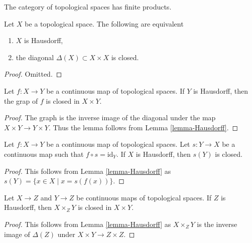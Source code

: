 \noindent
The category of topological spaces has finite products.

\begin{lemma}
\label{lemma-Hausdorff}
Let $X$ be a topological space. The following are equivalent
\begin{enumerate}
\item $X$ is Hausdorff,
\item the diagonal $\Delta(X) \subset X \times X$ is closed.
\end{enumerate}
\end{lemma}

\begin{proof}
Omitted.
\end{proof}

\begin{lemma}
\label{lemma-graph-closed}
Let $f : X \to Y$ be a continuous map of topological spaces.
If $Y$ is Hausdorff, then the grap of $f$ is closed in $X \times Y$.
\end{lemma}

\begin{proof}
The graph is the inverse image of the diagonal under the map
$X \times Y \to Y \times Y$. Thus the lemma follows from
Lemma \ref{lemma-Hausdorff}.
\end{proof}

\begin{lemma}
\label{lemma-section-closed}
Let $f : X \to Y$ be a continuous map of topological spaces.
Let $s : Y \to X$ be a continuous map such that $f \circ s = \text{id}_Y$.
If $X$ is Hausdorff, then $s(Y)$ is closed.
\end{lemma}

\begin{proof}
This follows from Lemma \ref{lemma-Hausdorff} as
$s(Y) = \{x \in X \mid x = s(f(x))\}$.
\end{proof}

\begin{lemma}
\label{lemma-fibre-product-closed}
Let $X \to Z$ and $Y \to Z$ be continuous maps of topological spaces.
If $Z$ is Hausdorff, then  $X \times_Z Y$ is closed in $X \times Y$.
\end{lemma}

\begin{proof}
This follows from Lemma \ref{lemma-Hausdorff} as
$X \times_Z Y$ is the inverse image of $\Delta(Z)$
under $X \times Y \to Z \times Z$.
\end{proof}







